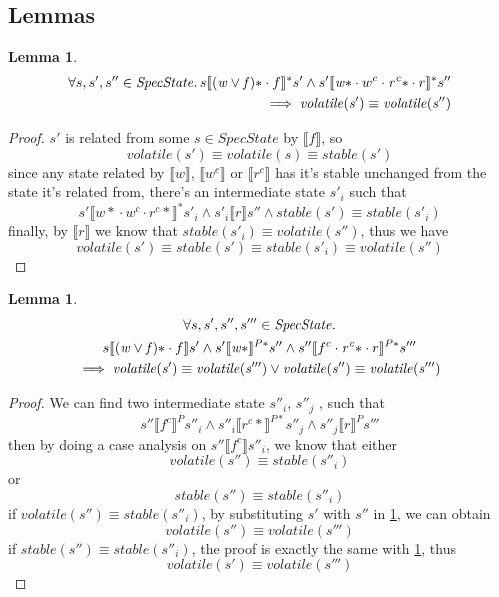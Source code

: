 \documentclass[a4paper,11pt]{article}
\newtheorem{lemma}[theorem]{Lemma}
\theoremstyle{definition}
\begin{document}
\subsection{Lemmas}

\begin{lemma}\label{lemma-2-1}
\begin{align*}
	\forall s, s', s'' \in \mathit{SpecState} \ldotp s \llbracket \mathit{(w \lor f)\ast} \cdot f \rrbracket^* s' \land s' \llbracket \mathit{w\ast} \cdot w^c \cdot \mathit{r^c\ast} \cdot r \rrbracket^* s'' \\
	  \implies \mathit{volatile(s')} \equiv \mathit{volatile(s'')}
\end{align*}
\end{lemma}
\begin{proof}
	$s'$ is related from some $s \in \mathit{SpecState}$ by $\llbracket f \rrbracket$, so
		$$\mathit{volatile(s')} \equiv \mathit{volatile(s)} \equiv \mathit{stable(s')}$$
	since any state related by $\llbracket w \rrbracket$, $\llbracket w^c \rrbracket$ or $\llbracket r^c \rrbracket$ has it's stable unchanged from the state it's related from, there's an intermediate state $s'_i$ such that
		$$s' \llbracket {w*} \cdot w^c \cdot {r^c *} \rrbracket^* s'_i \land s'_i \llbracket r \rrbracket s'' \land stable(s') \equiv stable(s'_i)$$
	finally, by $\llbracket r \rrbracket$ we know that $\mathit{stable(s'_i) \equiv volatile(s'')}$, thus we have
		$$\mathit{volatile(s') \equiv stable(s') \equiv stable(s'_i) \equiv volatile(s'')}$$
\end{proof}

\begin{lemma}\label{lemma-2-2}
\begin{multline*}
      \forall s, s', s'', s''' \in \mathit{SpecState} \ldotp \\
      s \llbracket \mathit{(w \lor f)\ast} \cdot f \rrbracket s' \land
	  s' \llbracket \mathit{w\ast} \rrbracket^{P*} s'' \land
	  s'' \llbracket f^c \cdot \mathit{r^c\ast} \cdot r \rrbracket^{P*} s'''\\ \implies \mathit{volatile(s')} \equiv \mathit{volatile(s''')} \lor \mathit{volatile(s'')} \equiv \mathit{volatile(s''')}
\end{multline*}
\end{lemma}
\begin{proof}
	We can find two intermediate state $s''_i$, $s''_j$ , such that $$s'' \llbracket f^c \rrbracket^P s''_i \land s''_i \llbracket r^c* \rrbracket^{P*} s''_j \land s''_j \llbracket r \rrbracket^P s'''$$
	then by doing a case analysis on $s'' \llbracket f^c \rrbracket s''_i$, we know that either $$\mathit{volatile(s'') \equiv stable(s''_i)}$$ or $$\mathit{stable(s'') \equiv stable(s''_i)}$$
	if $\mathit{volatile(s'') \equiv stable(s''_i)}$, by substituting $s'$ with $s''$ in
	\cref{lemma-2-1}, we can obtain $$\mathit{volatile(s'') \equiv volatile(s''')}$$
	if $\mathit{stable(s'') \equiv stable(s''_i)}$, the proof is exactly the same with \cref{lemma-2-1}, thus $$\mathit{volatile(s') \equiv volatile(s''')}$$
\end{proof}
\end{document}
